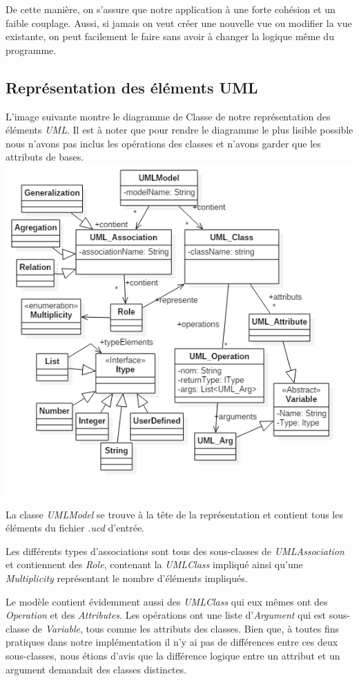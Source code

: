 \documentclass[letter,french]{report}
\begin{document}
	De cette manière, on s’assure que notre application à une forte cohésion et
  un faible couplage. Aussi, si jamais on veut créer une nouvelle vue ou
  modifier la vue existante, on peut facilement le faire sans avoir à changer
  la logique même du programme.
	
	\subsection*{Représentation des éléments UML}
	L'image suivante montre le diagramme de Classe de notre représentation des
  éléments \emph{UML}. Il est à noter que pour rendre le diagramme le plus
  lisible possible nous n'avons pas inclus les opérations des classes et n'avons
  garder que les attributs de bases.
	\newline 
	\includegraphics[scale=.7]{images/UML_diagram.png}

  La classe \emph{UMLModel} se trouve à la tête de la représentation et
  contient tous les éléments du fichier \emph{.ucd} d'entrée.

  Les différents types d'associations sont tous des sous-classes de
  \emph{UMLAssociation} et contiennent des \emph{Role}, contenant la
  \emph{UMLClass} impliqué ainsi qu'une \emph{Multiplicity} représentant le
  nombre d'éléments impliqués.

  Le modèle contient évidemment aussi des \emph{UMLClass} qui eux mêmes ont des
  \emph{Operation} et des \emph{Attributes}. Les opérations ont une liste
  d'\emph{Argument} qui est sous-classe de \emph{Variable}, tous comme les
  attributs des classes. Bien que, à toutes fins pratiques dans notre
  implémentation il n'y ai pas de différences entre ces deux sous-classes, nous
  étions d'avis que la différence logique entre un attribut et un argument
  demandait des classes distinctes.
\end{document}
